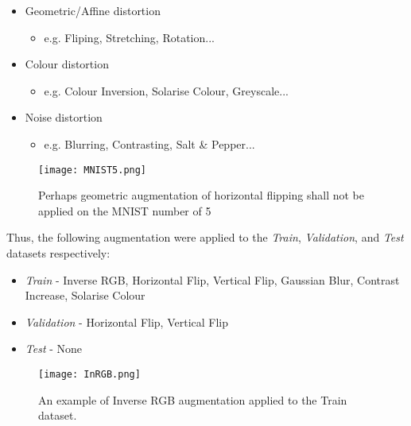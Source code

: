 \documentclass[11pt, a4paper, twoside]{report}
\begin{document}
\begin{itemize}
  \item Geometric/Affine distortion
    \begin{itemize}
      \item e.g. Fliping, Stretching, Rotation...
    \end{itemize}
\end{itemize}
\begin{itemize}
  \item Colour distortion
    \begin{itemize}
      \item e.g. Colour Inversion, Solarise Colour, Greyscale...
    \end{itemize}
\end{itemize}
\begin{itemize}
  \item Noise distortion
    \begin{itemize}
      \item e.g. Blurring, Contrasting, Salt \& Pepper...
    \end{itemize}
\end{itemize}


\begin{figure}[H]
  \centering
  \texttt{[image: MNIST5.png]}
  \caption{Perhaps geometric augmentation of horizontal flipping shall not be applied on the MNIST number of 5}
  \label{fig:MNIST5}
\end{figure}

Thus, the following augmentation were applied to the \textit{Train}, \textit{Validation}, and \textit{Test} datasets respectively:

\begin{itemize}
  \item \textit{Train} - Inverse RGB, Horizontal Flip, Vertical Flip, Gaussian Blur, Contrast Increase, Solarise Colour
  \item \textit{Validation} - Horizontal Flip, Vertical Flip
  \item \textit{Test} - None
\end{itemize}

\begin{figure}[H]
  \centering
  \texttt{[image: InRGB.png]}
  \caption{An example of Inverse RGB augmentation applied to the Train dataset.}
  \label{fig:InRGB}
\end{figure}
\end{document}
